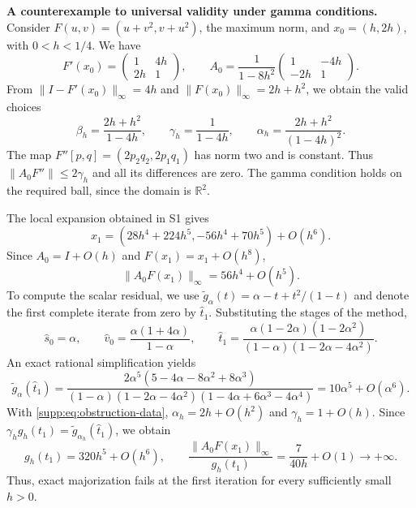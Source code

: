 \documentclass[11pt,a4paper]{article}
\numberwithin{equation}{section}
\numberwithin{table}{section}
\theoremstyle{plain}
\theoremstyle{definition}\newtheorem{definition}[theorem]{Definition}
\theoremstyle{remark}\newtheorem{remark}[theorem]{Remark}
\begin{document}
\medskip\noindent\textbf{A counterexample to universal validity under gamma conditions.}
Consider $F(u,v)=(u+v^2,v+u^2)$, the maximum norm, and $x_0=(h,2h)$,
with $0<h<1/4$. We have
\[
 F'(x_0)=\begin{pmatrix}1&4h\\2h&1\end{pmatrix},\qquad
 A_0=\frac1{1-8h^2}
       \begin{pmatrix}1&-4h\\-2h&1\end{pmatrix}.
\]
From $\|I-F'(x_0)\|_\infty=4h$ and
$\|F(x_0)\|_\infty=2h+h^2$, we obtain the valid choices
\begin{equation}
 \beta_h=\frac{2h+h^2}{1-4h},\qquad
 \gamma_h=\frac1{1-4h},\qquad
 \alpha_h=\frac{2h+h^2}{(1-4h)^2}.
 \label{supp:eq:obstruction-data}
\end{equation}
The map $F''[p,q]=(2p_2q_2,2p_1q_1)$ has norm two and is constant.
Thus $\|A_0F''\|\leq2\gamma_h$ and all its differences are zero.
The gamma condition holds on the required ball, since the domain is
$\mathbb R^2$.

The local expansion obtained in S1 gives
\[
 x_1=(28h^4+224h^5,-56h^4+70h^5)+O(h^6).
\]
Since $A_0=I+O(h)$ and $F(x_1)=x_1+O(h^8)$,
\begin{equation}
 \|A_0F(x_1)\|_\infty=56h^4+O(h^5).
 \label{supp:eq:obstruction-real-residual}
\end{equation}
To compute the scalar residual, we use
$\widetilde g_\alpha(t)=\alpha-t+t^2/(1-t)$ and denote the first
complete iterate from zero by $\widehat t_1$. Substituting the
stages of the method,
\[
 \widehat s_0=\alpha,\qquad
 \widehat v_0=\frac{\alpha(1+4\alpha)}{1-\alpha},\qquad
 \widehat t_1=
 \frac{\alpha(1-2\alpha)(1-2\alpha^2)}
 {(1-\alpha)(1-2\alpha-4\alpha^2)}.
\]
An exact rational simplification yields
\begin{equation}
 \widetilde g_\alpha(\widehat t_1)=
 \frac{2\alpha^5(5-4\alpha-8\alpha^2+8\alpha^3)}
 {(1-\alpha)(1-2\alpha-4\alpha^2)
  (1-4\alpha+6\alpha^3-4\alpha^4)}
 =10\alpha^5+O(\alpha^6).
 \label{supp:eq:obstruction-scalar-residual}
\end{equation}
With \eqref{supp:eq:obstruction-data}, $\alpha_h=2h+O(h^2)$ and
$\gamma_h=1+O(h)$. Since
$\gamma_h g_h(t_1)=\widetilde g_{\alpha_h}(\widehat t_1)$, we obtain
\[
 g_h(t_1)=320h^5+O(h^6),\qquad
 \frac{\|A_0F(x_1)\|_\infty}{g_h(t_1)}
 =\frac{7}{40h}+O(1)\longrightarrow+\infty.
\]
Thus, exact majorization fails at the first iteration for every
sufficiently small $h>0$.
\end{document}
